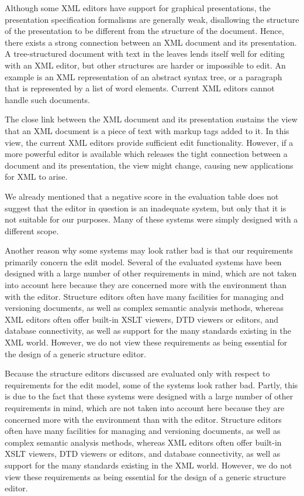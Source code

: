 \documentclass{speauth}
\begin{document}
Although some XML editors have support for graphical presentations, the presentation specification formalisms are generally weak, disallowing the structure of the presentation to be different from the structure of the document. Hence, there exists a strong connection between an XML document and its presentation. A tree-structured document with text in the leaves lends itself well for editing with an XML editor, but other structures are harder or impossible to edit. An example is an XML representation of an abstract syntax tree, or a paragraph that is represented by a list of word elements. Current XML editors cannot handle such documents.

The close link between the XML document and its presentation sustains the view that an XML document is a piece of text with markup tags added to it. In this view, the current XML editors provide sufficient edit functionality. However, if a more powerful editor is available which releases the tight connection between a document and its presentation, the view might change, causing new applications for XML to arise.


\bigskip
{}


We already mentioned that a negative score in the evaluation table does not suggest that the editor in question is an inadequate system, but only that it is not suitable for our purposes. Many of these systems were simply designed with a different scope.

Another reason why some systems may look rather bad is that our requirements primarily concern the edit model. Several of the evaluated systems have been designed with a large number of other requirements in mind, which are not taken into account here because they are concerned more with the environment than with the editor. Structure editors often have many facilities for managing and versioning documents, as well as complex semantic analysis methods, whereas XML editors often offer built-in XSLT viewers, DTD viewers or editors, and database connectivity, as well as support for the many standards existing in the XML world. However, we do not view these requirements as being essential for the design of a generic structure editor.


\bc
Because the structure editors discussed are evaluated only with respect to requirements for the edit model, some of the systems look rather bad. Partly, this is due to the fact that these systems were designed with a large number of other requirements in mind, which are not taken into account here because they are concerned more with the environment than with the editor. Structure editors often have many facilities for managing and versioning documents, as well as complex semantic analysis methods, whereas XML editors often offer built-in XSLT viewers, DTD viewers or editors, and database connectivity, as well as support for the many standards existing in the XML world. However, we do not view these requirements as being essential for the design of a generic structure editor.
\ec
\end{document}
